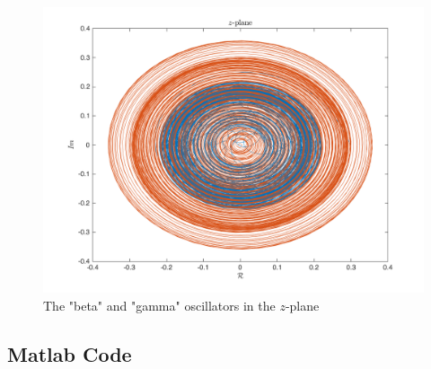 \documentclass[usletter,12pt]{article} %
\begin{document}
\begin{figure}[H]
\centering
\includegraphics[scale=0.275]{images/simple_model_z}
\caption{The "beta" and "gamma" oscillators in the $z$-plane}
\label{fig:simple_model_z}
\end{figure}


\subsection{Matlab Code}
\end{document}
